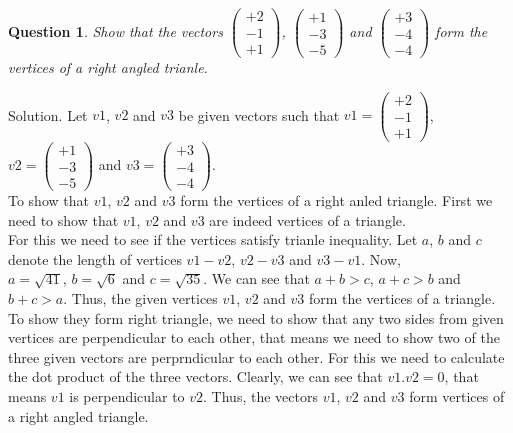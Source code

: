 \documentclass{article}
\newtheorem{question}[theorem]{Question}
\begin{document}
\begin{question}
	Show that the vectors $\begin{pmatrix} 
		 +2\\-1\\+1 
	\end{pmatrix}$, $\begin{pmatrix} 
	 +1\\-3\\-5 
\end{pmatrix}$ and $\begin{pmatrix} 
+3\\-4\\-4 
\end{pmatrix}$ form the vertices of a right angled trianle.
\end{question}
Solution. Let $v1$, $v2$ and $v3$ be given vectors such that $v1 =\begin{pmatrix} 
	+2\\-1\\+1 
\end{pmatrix}$,\\     
$v2= \begin{pmatrix} 
+1\\-3\\-5 
\end{pmatrix}$ and $v3= \begin{pmatrix} 
+3\\-4\\-4 
\end{pmatrix}$.\\
To show that $v1$, $v2$ and $v3$ form the vertices of a right anled triangle. First we need to show that $v1$, $v2$ and $v3$ are indeed vertices of a triangle.\\
For this we need to see if the vertices satisfy trianle inequality. Let $a$, $b$ and $c$ denote the length of vertices $v1-v2$, $v2-v3$ and $v3-v1$. Now,\\
$a=\sqrt{41}$, $b=\sqrt{6}$ and $c=\sqrt{35}$. We can see that  $a+b>c$, 
$a+c>b$ and $b+c >a$. Thus, the given vertices $v1$, $v2$ and $v3$ form the vertices of a triangle.\\
To show they form right triangle, we need to show that any two sides from given vertices are perpendicular to each other, that means we need to show two of the three given vectors are perprndicular to each other. For this we need to calculate the dot product of the three vectors. Clearly, we can see that $v1.v2 =0$, that means $v1$ is perpendicular to $v2$. Thus, the vectors $v1$, $v2$ and $v3$ form vertices of a right angled triangle.  
\end{document}
